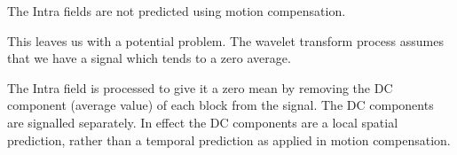 The Intra fields are not predicted using motion compensation.

This leaves us with a potential problem. The wavelet transform process
assumes that we have a signal which tends to a zero average.

The Intra field is processed to give it a zero mean by removing the DC
component (average value) of each block from the signal. The DC
components are signalled separately. In effect the DC components are a
local spatial prediction, rather than a temporal prediction as applied
in motion compensation.
